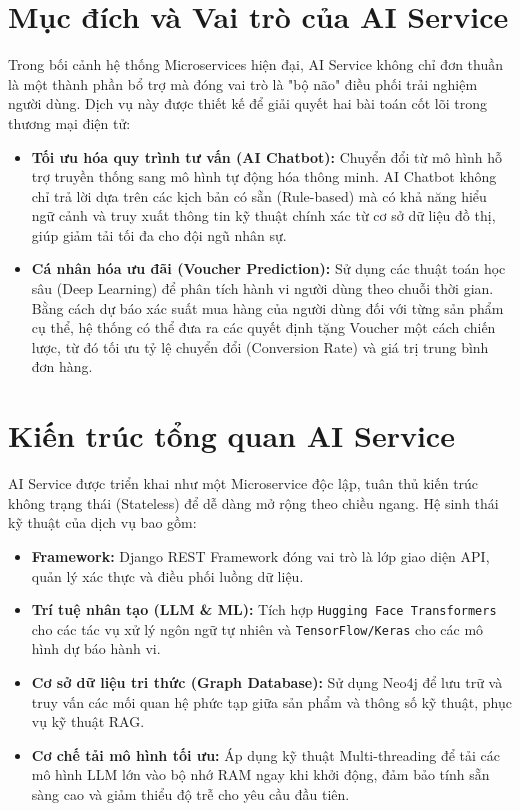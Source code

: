 \documentclass[12pt,a4paper]{report}
\begin{document}
\section{Mục đích và Vai trò của AI Service}
Trong bối cảnh hệ thống Microservices hiện đại, AI Service không chỉ đơn thuần là một thành phần bổ trợ mà đóng vai trò là "bộ não" điều phối trải nghiệm người dùng. Dịch vụ này được thiết kế để giải quyết hai bài toán cốt lõi trong thương mại điện tử:
\begin{itemize}
    \item \textbf{Tối ưu hóa quy trình tư vấn (AI Chatbot):} Chuyển đổi từ mô hình hỗ trợ truyền thống sang mô hình tự động hóa thông minh. AI Chatbot không chỉ trả lời dựa trên các kịch bản có sẵn (Rule-based) mà có khả năng hiểu ngữ cảnh và truy xuất thông tin kỹ thuật chính xác từ cơ sở dữ liệu đồ thị, giúp giảm tải tối đa cho đội ngũ nhân sự.
    \item \textbf{Cá nhân hóa ưu đãi (Voucher Prediction):} Sử dụng các thuật toán học sâu (Deep Learning) để phân tích hành vi người dùng theo chuỗi thời gian. Bằng cách dự báo xác suất mua hàng của người dùng đối với từng sản phẩm cụ thể, hệ thống có thể đưa ra các quyết định tặng Voucher một cách chiến lược, từ đó tối ưu tỷ lệ chuyển đổi (Conversion Rate) và giá trị trung bình đơn hàng.
\end{itemize}

\section{Kiến trúc tổng quan AI Service}
AI Service được triển khai như một Microservice độc lập, tuân thủ kiến trúc không trạng thái (Stateless) để dễ dàng mở rộng theo chiều ngang. Hệ sinh thái kỹ thuật của dịch vụ bao gồm:
\begin{itemize}
    \item \textbf{Framework:} Django REST Framework đóng vai trò là lớp giao diện API, quản lý xác thực và điều phối luồng dữ liệu.
    \item \textbf{Trí tuệ nhân tạo (LLM \& ML):} Tích hợp \texttt{Hugging Face Transformers} cho các tác vụ xử lý ngôn ngữ tự nhiên và \texttt{TensorFlow/Keras} cho các mô hình dự báo hành vi.
    \item \textbf{Cơ sở dữ liệu tri thức (Graph Database):} Sử dụng Neo4j để lưu trữ và truy vấn các mối quan hệ phức tạp giữa sản phẩm và thông số kỹ thuật, phục vụ kỹ thuật RAG.
    \item \textbf{Cơ chế tải mô hình tối ưu:} Áp dụng kỹ thuật Multi-threading để tải các mô hình LLM lớn vào bộ nhớ RAM ngay khi khởi động, đảm bảo tính sẵn sàng cao và giảm thiểu độ trễ cho yêu cầu đầu tiên.
\end{itemize}
\end{document}
